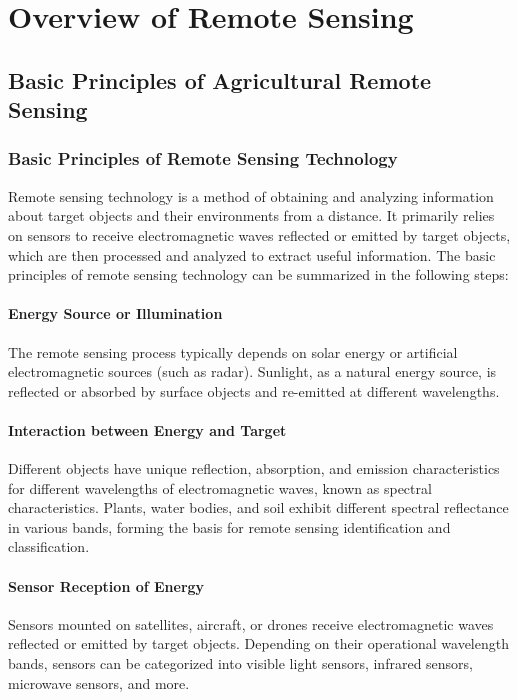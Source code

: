 \section{Overview of Remote Sensing}

\subsection{Basic Principles of Agricultural Remote Sensing}

\subsubsection{Basic Principles of Remote Sensing Technology}

Remote sensing technology is a method of obtaining and analyzing information about target objects and their environments from a distance. It primarily relies on sensors to receive electromagnetic waves reflected or emitted by target objects, which are then processed and analyzed to extract useful information. The basic principles of remote sensing technology can be summarized in the following steps\cite{geRemoteSensingSoil2011}:

\paragraph{Energy Source or Illumination} The remote sensing process typically depends on solar energy or artificial electromagnetic sources (such as radar). Sunlight, as a natural energy source, is reflected or absorbed by surface objects and re-emitted at different wavelengths.

\paragraph{Interaction between Energy and Target}Different objects have unique reflection, absorption, and emission characteristics for different wavelengths of electromagnetic waves, known as spectral characteristics. Plants, water bodies, and soil exhibit different spectral reflectance in various bands, forming the basis for remote sensing identification and classification.

\paragraph{Sensor Reception of Energy}Sensors mounted on satellites, aircraft, or drones receive electromagnetic waves reflected or emitted by target objects. Depending on their operational wavelength bands, sensors can be categorized into visible light sensors, infrared sensors, microwave sensors, and more.

